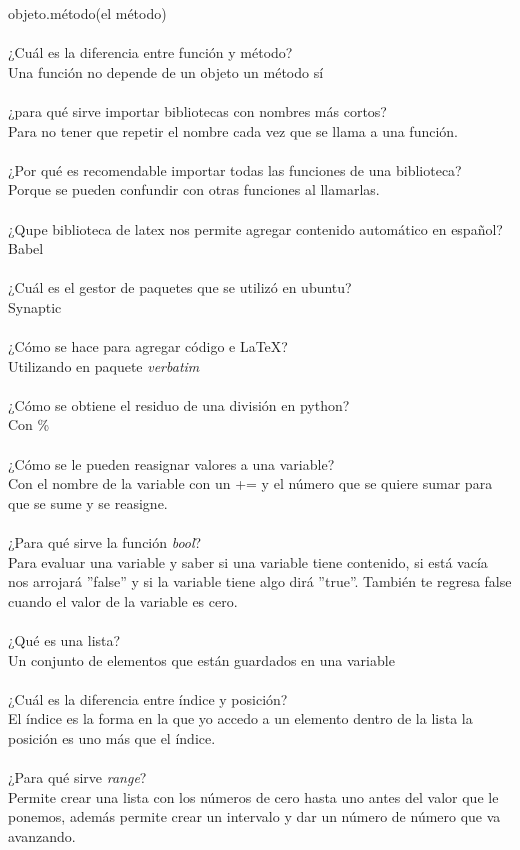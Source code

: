\documentclass{article}
\begin{document}
objeto.método(el método)\\
\\
¿Cuál es la diferencia entre función y método?\\
Una función no depende de un objeto un método sí\\
\\
¿para qué sirve importar bibliotecas con nombres más cortos?\\
Para no tener que repetir el nombre cada vez que se llama a una función.\\
\\
¿Por qué es recomendable importar todas las funciones de una biblioteca?\\
Porque se pueden confundir con otras funciones al llamarlas. \\
\\
¿Qupe biblioteca de latex nos permite agregar contenido automático en español?\\
Babel\\
\\
¿Cuál es el gestor de paquetes que se utilizó en ubuntu?\\
Synaptic\\
\\
¿Cómo se hace para agregar código e LaTeX?\\
Utilizando en paquete \textit{verbatim}\\
\\
¿Cómo se obtiene el residuo de una división en python?\\
Con \%\\
\\
¿Cómo se le pueden reasignar valores a una variable?\\
Con el nombre de la variable con un += y el número que se quiere sumar para que se sume y se reasigne.\\
\\
¿Para qué sirve la función \textit{bool}? \\
Para evaluar una variable y saber si una variable tiene contenido, si está vacía nos arrojará ”false” y si la variable tiene algo dirá ”true”. También te regresa false cuando el valor de la variable es cero.\\
\\
¿Qué es una lista?\\
Un conjunto de elementos que están guardados en una variable\\
\\
¿Cuál es la diferencia entre índice y posición?\\
El índice es la forma en la que yo accedo a un elemento dentro de la lista la posición es uno más que el índice.\\
\\
¿Para qué sirve \textit{range}?\\
Permite crear una lista con los números de cero hasta uno antes del valor que le ponemos, además permite crear un intervalo y dar un número de número que va avanzando.\\
\end{document}
